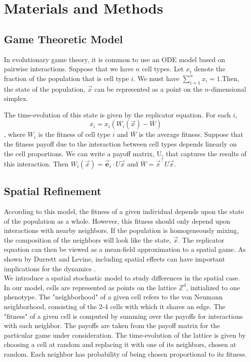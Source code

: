 \documentclass[12pt]{report}
\begin{document}
\chapter*{Materials and Methods}
\section*{Game Theoretic Model}
	In evolutionary game theory, it is common to use an ODE model based on pairwise interactions. Suppose that we have $n$ cell types. Let $x_i$ denote the fraction of the population that is cell type $i$. We must have $\sum_{i=1}^n x_i = 1$.Then, the state of the population, $\vec{x}$ can be represented as a point on the $n$-dimensional simplex. 
	
	The time-evolution of this state is given by the replicator equation. For each $i$, $$\dot{x_i} = x_i (W_i(\vec{x}) - \overline{W})$$, where $W_i$ is the fitness of cell type $i$ and $\overline{W}$ is the average fitness. Suppose that the fitness payoff due to the interaction between cell types depends linearly on the cell proportions. We can write a payoff matrix, U, that captures the results of this interaction. Then $W_i(\vec{x}) = \vec{\textbf{e}}_i \cdot U\vec{x} $ and $\overline{W} = \vec{x}^\top U \vec{x}$.
	
\section*{Spatial Refinement}

According to this model, the fitness of a given individual depends upon the state of the population as a whole. However, this fitness should only depend upon interactions with nearby neighbors. If the population is homogeneously mixing, the composition of the neighbors will look like the state, $ \vec{x} $. The replicator equation can then be viewed as a mean-field approximation to a spatial game. As shown by Durrett and Levine, including spatial effects can have important implications for the dynamics \cite{Durrett1994}.\\

We introduce a spatial stochastic model to study differences in the spatial case. In our model, cells are represented as points on the lattice $\mathbb{Z}^d$, initialized to one phenotype. The "neighborhood" of a given cell refers to the von Neumann neighborhood, consisting of the 2-4 cells with which it shares an edge. The "fitness" of a given cell is computed by summing over the payoffs for interactions with each neighbor. The payoffs are taken from the payoff matrix for the particular game under consideration. The time-evolution of the lattice is given by choosing a cell at random and replacing it with one of its neighbors, chosen at random. Each neighbor has probability of being chosen proportional to its fitness. 
\end{document}
